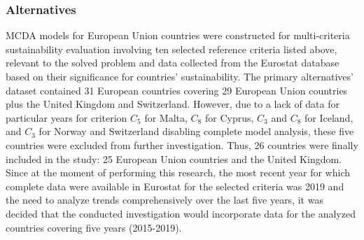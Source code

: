 \documentclass[final,5p,times,twocolumn,authoryear]{elsarticle}
\begin{document}
\normalsize	
\subsubsection{Alternatives}
\label{sec:ModelAlternatives}
MCDA models for European Union countries were constructed for multi-criteria sustainability evaluation involving ten selected reference criteria listed above, relevant to the solved problem and data collected from the Eurostat database~\citep{eurostat2021} based on their significance for countries' sustainability. The primary alternatives' dataset contained 31 European countries covering 29 European Union countries plus the United Kingdom and Switzerland. However, due to a lack of data for particular years for criterion $C_{5}$ for Malta, $C_{8}$ for Cyprus, $C_{3}$ and $C_{8}$ for Iceland, and $C_{3}$ for Norway and Switzerland disabling complete model analysis, these five countries were excluded from further investigation. Thus, 26 countries were finally included in the study: 25 European Union countries and the United Kingdom. Since at the moment of performing this research, the most recent year for which complete data were available in Eurostat for the selected criteria was 2019 and the need to analyze trends comprehensively over the last five years, it was decided that the conducted investigation would incorporate data for the analyzed countries covering five years (2015-2019).
%
\end{document}
